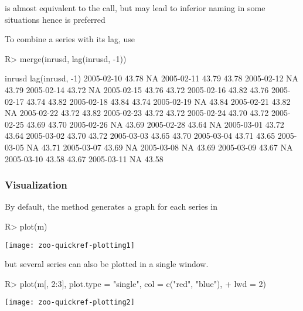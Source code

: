 \documentclass{Z}
\newcommand{\mysection}[1]{\subsubsection[#1]{\textbf{#1}}}
\begin{document}
 is almost equivalent to the 
call, but may lead to inferior naming in some situations 
hence  is preferred

To combine a series with its lag, use
\begin{Schunk}
\begin{Sinput}
R> merge(inrusd, lag(inrusd, -1))
\end{Sinput}
\begin{Soutput}
           inrusd lag(inrusd, -1)
2005-02-10 43.78     NA          
2005-02-11 43.79  43.78          
2005-02-12    NA  43.79          
2005-02-14 43.72     NA          
2005-02-15 43.76  43.72          
2005-02-16 43.82  43.76          
2005-02-17 43.74  43.82          
2005-02-18 43.84  43.74          
2005-02-19    NA  43.84          
2005-02-21 43.82     NA          
2005-02-22 43.72  43.82          
2005-02-23 43.72  43.72          
2005-02-24 43.70  43.72          
2005-02-25 43.69  43.70          
2005-02-26    NA  43.69          
2005-02-28 43.64     NA          
2005-03-01 43.72  43.64          
2005-03-02 43.70  43.72          
2005-03-03 43.65  43.70          
2005-03-04 43.71  43.65          
2005-03-05    NA  43.71          
2005-03-07 43.69     NA          
2005-03-08    NA  43.69          
2005-03-09 43.67     NA          
2005-03-10 43.58  43.67          
2005-03-11    NA  43.58          
\end{Soutput}
\end{Schunk}

\mysection{Visualization}

By default, the  method generates a graph for each
series in 
\begin{center}
\begin{Schunk}
\begin{Sinput}
R> plot(m)
\end{Sinput}
\end{Schunk}
\texttt{[image: zoo-quickref-plotting1]}
\end{center}

but several series can also be plotted in a single window.
\begin{center}
\begin{Schunk}
\begin{Sinput}
R> plot(m[, 2:3], plot.type = "single", col = c("red", "blue"), 
+     lwd = 2)
\end{Sinput}
\end{Schunk}
\texttt{[image: zoo-quickref-plotting2]}
\end{center}
\end{document}
